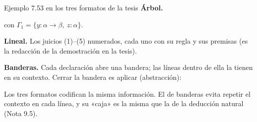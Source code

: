 \documentclass[11pt,a4paper]{article}
\begin{document}
\begin{ejemplotesis}{Ejemplo 7.53 en los tres formatos de la tesis}
\textbf{Árbol.}
\begin{prooftree}
\end{prooftree}
con \(\Gamma_1=\{y:\alpha\to\beta,\ z:\alpha\}\).

\textbf{Lineal.} Los juicios (1)--(5) numerados, cada uno con su regla y sus
premisas (es la redacción de la demostración en la tesis).

\textbf{Banderas.} Cada declaración abre una bandera; las líneas dentro de ella
la tienen en su contexto. Cerrar la bandera es aplicar (abstracción):
\begin{center}
\begin{flagderiv}[fdsiete]
\end{flagderiv}
\end{center}
Los tres formatos codifican la misma información. El de banderas evita
repetir el contexto en cada línea, y su «caja» es la misma que la de la
deducción natural (Nota 9.5).
\end{ejemplotesis}
\end{document}
